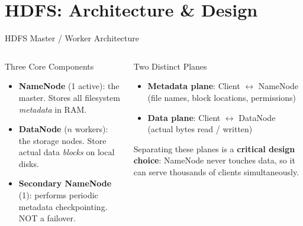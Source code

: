 \documentclass[aspectratio=169,10pt]{beamer}
\begin{document}
\section{HDFS: Architecture \& Design}

\begin{frame}{HDFS Master / Worker Architecture}
  \begin{columns}[T]
      \begin{block}{Three Core Components}
        \begin{itemize}
          \item \textbf{NameNode} (1 active): the master.  Stores all filesystem \emph{metadata} in RAM.
          \item \textbf{DataNode} ($n$ workers): the storage nodes.  Store actual data \emph{blocks} on local disks.
          \item \textbf{Secondary NameNode} (1): performs periodic metadata checkpointing.  \alert{NOT} a failover.
        \end{itemize}
      \end{block}
      \vspace{4pt}
      \begin{alertblock}{Two Distinct Planes}
        \begin{itemize}
          \item \textbf{Metadata plane}: Client $\leftrightarrow$ NameNode\\(file names, block locations, permissions)
          \item \textbf{Data plane}: Client $\leftrightarrow$ DataNode\\(actual bytes read / written)
        \end{itemize}
        Separating these planes is a \textbf{critical design choice}: NameNode never touches data, so it can serve thousands of clients simultaneously.
      \end{alertblock}


\end{columns}
\end{frame}
\end{document}
